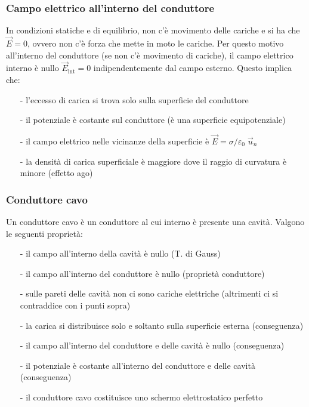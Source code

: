\documentclass[a4paper]{article}
\newcommand\un{\vec{u}_n}
\begin{document}
\subsubsection*{Campo elettrico all'interno del conduttore}
In condizioni statiche e di equilibrio, non c'è movimento delle cariche e si ha che \(\vec{E} = 0\), ovvero non c'è forza che
mette in moto le cariche. Per questo motivo all'interno del conduttore (se non c'è movimento di cariche), il campo elettrico
interno è nullo \(\vec{E}_\text{int} = 0\) indipendentemente dal campo esterno. Questo implica che:
\begin{itemize}[topsep=3pt, itemsep=0pt]
	\item[-] l'eccesso di carica si trova solo sulla superficie del conduttore
	\item[-] il potenziale è costante sul conduttore (è una superficie equipotenziale)
	\item[-] il campo elettrico nelle vicinanze della superficie è \(\vec{E} = \sigma / \varepsilon_0 \; \un\)
	\item[-] la densità di carica superficiale è maggiore dove il raggio di curvatura è minore (effetto ago)
\end{itemize}

\subsubsection*{Conduttore cavo}
Un conduttore cavo è un conduttore al cui interno è presente una cavità. Valgono le seguenti proprietà:
\begin{itemize}[topsep=3pt, itemsep=0pt]
	\item[-] il campo all'interno della cavità è nullo (T. di Gauss)
	\item[-] il campo all'interno del conduttore è nullo (proprietà conduttore)
	\item[-] sulle pareti delle cavità non ci sono cariche elettriche (altrimenti ci si contraddice con i punti sopra)
	\item[-] la carica si distribuisce solo e soltanto sulla superficie esterna (conseguenza)
	\item[-] il campo all'interno del conduttore e delle cavità è nullo (conseguenza)
	\item[-] il potenziale è costante all'interno del conduttore e delle cavità (conseguenza)
	\item[-] il conduttore cavo costituisce uno schermo elettrostatico perfetto
\end{itemize}
\end{document}
